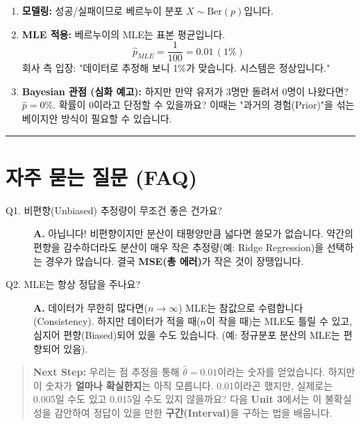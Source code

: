 \documentclass[11pt,a4paper]{book}
\theoremstyle{definition}
\begin{document}
\begin{enumerate}
    \item \textbf{모델링:} 성공/실패이므로 베르누이 분포 $X \sim \text{Ber}(p)$입니다.
    \item \textbf{MLE 적용:} 베르누이의 MLE는 표본 평균입니다.
    $$ \hat{p}_{MLE} = \frac{1}{100} = 0.01 \, (1\%) $$
    회사 측 입장: "데이터로 추정해 보니 1\%가 맞습니다. 시스템은 정상입니다."
    
    \item \textbf{Bayesian 관점 (심화 예고):} 하지만 만약 유저가 3명만 돌려서 0명이 나왔다면? $\hat{p}=0\%$. 확률이 0이라고 단정할 수 있을까요? 이때는 "과거의 경험(Prior)"을 섞는 베이지안 방식이 필요할 수 있습니다.
\end{enumerate}

\vspace{0.5cm}\hrule\vspace{0.5cm}

\section{자주 묻는 질문 (FAQ)}

\begin{description}
    \item[Q1. 비편향(Unbiased) 추정량이 무조건 좋은 건가요?]
    \textbf{A.} 아닙니다! 비편향이지만 분산이 태평양만큼 넓다면 쓸모가 없습니다. 약간의 편향을 감수하더라도 분산이 매우 작은 추정량(예: Ridge Regression)을 선택하는 경우가 많습니다. 결국 \textbf{MSE(총 에러)}가 작은 것이 장땡입니다.

    \item[Q2. MLE는 항상 정답을 주나요?]
    \textbf{A.} 데이터가 무한히 많다면($n \to \infty$) MLE는 참값으로 수렴합니다(Consistency). 하지만 데이터가 적을 때($n$이 작을 때)는 MLE도 틀릴 수 있고, 심지어 편향(Biased)되어 있을 수도 있습니다. (예: 정규분포 분산의 MLE는 편향되어 있음).
\end{description}

\vspace{1cm}
\begin{quote}
\textbf{Next Step:} 우리는 점 추정을 통해 $\hat{\theta} = 0.01$이라는 숫자를 얻었습니다. 하지만 이 숫자가 \textbf{얼마나 확실한지}는 아직 모릅니다. 0.01이라곤 했지만, 실제로는 0.005일 수도 있고 0.015일 수도 있지 않을까요? 다음 \textbf{Unit 3}에서는 이 불확실성을 감안하여 정답이 있을 만한 \textbf{구간(Interval)}을 구하는 법을 배웁니다.
\end{quote}
\end{document}

